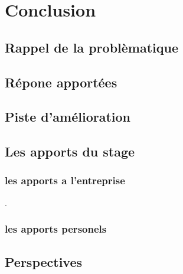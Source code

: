 \hypertarget{conclusion}{%
\chapter{Conclusion}\label{conclusion}}

\section{Rappel de la problèmatique}

\section{Répone apportées}

\section{Piste d'amélioration}

\section{Les apports du stage}
\subsection{les apports a l'entreprise}
.
\subsection{les apports personels}


\section{Perspectives}
